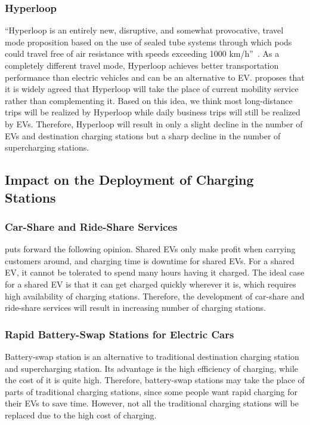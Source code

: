 \documentclass{mcmthesis}
\begin{document}
\subsubsection*{Hyperloop}
``Hyperloop is an entirely new, disruptive, and somewhat provocative, travel mode proposition based on the use of sealed tube systems through which pods could travel free of air resistance with speeds exceeding 1000 km/h''~\cite{Nikitas2017}. As a completely different travel mode, Hyperloop achieves better transportation performance than electric vehicles and can be an alternative to EV. \cite{Nikitas2017} proposes that it is widely agreed that Hyperloop will take the place of current mobility service rather than complementing it. Based on this idea, we think most long-distance trips will be realized by Hyperloop while daily business trips will still be realized by EVs. Therefore, Hyperloop will result in only a slight decline in the number of EVs and destination charging stations but a sharp decline in the number of supercharging stations.
\subsection{Impact on the Deployment of Charging Stations}
\subsubsection*{Car-Share and Ride-Share Services}
\cite{SharedEV} puts forward the following opinion. Shared EVs only make profit when carrying customers around, and charging time is downtime for shared EVs. For a shared EV, it cannot be tolerated to spend many hours having it charged. The ideal case for a shared EV is that it can get charged quickly wherever it is, which requires high availability of charging stations. Therefore, the development of car-share and ride-share services will result in increasing number of charging stations.
\subsubsection*{Rapid Battery-Swap Stations for Electric Cars}
Battery-swap station is an alternative to traditional destination charging station and supercharging station. Its advantage is the high efficiency of charging, while the cost of it is quite high. Therefore, battery-swap stations may take the place of parts of traditional charging stations, since some people want rapid charging for their EVs to save time. However, not all the traditional charging stations will be replaced due to the high cost of charging.
\end{document}
